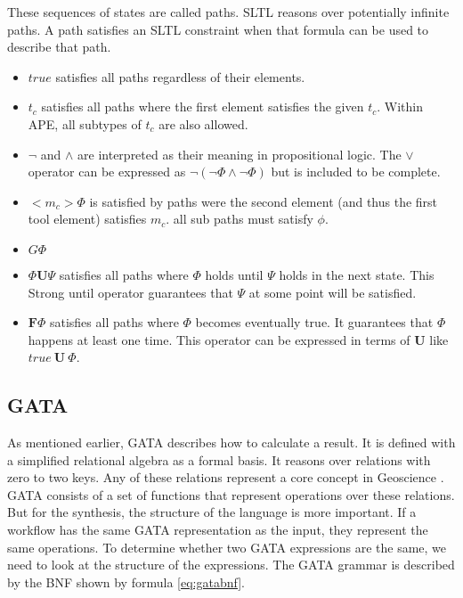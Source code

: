 \documentclass{article}
\begin{document}
These sequences of states are called paths. SLTL reasons over potentially infinite paths. A path satisfies an SLTL constraint when that formula can be used to describe that path. 

\begin{itemize}
    \item $true$ satisfies all paths regardless of their elements.
    \item $t_c$ satisfies all paths where the first element satisfies the given $t_c$. Within APE, all subtypes of $t_c$ are also allowed.
    \item $\neg$ and $\wedge$ are interpreted as their meaning in propositional logic. The $\vee$ operator can be expressed as $\neg(\neg \Phi \wedge \neg \Phi)$ but is included to be complete.
    
    \item $<m_c> \Phi$ is satisfied by paths were the second element (and thus the first tool element) satisfies $m_c$. all sub paths must satisfy $\phi$.
    
    \item $G\Phi$ 
    \item $\Phi \textbf{U} \Psi$ satisfies all paths where $\Phi$ holds until $\Psi$ holds in the next state. This Strong until operator guarantees that $\Psi$ at some point will be satisfied. 
    \item $\textbf{F}\Phi$ satisfies all paths where $\Phi$ becomes eventually true. It guarantees that $\Phi$ happens at least one time. This operator can be expressed in terms of \textbf{U} like $true\ \textbf{U}\ \Phi$.
    
\end{itemize}





\subsection{GATA}
As mentioned earlier, GATA describes how to calculate a result. It is defined with a simplified relational algebra as a formal basis. It reasons over relations with zero to two keys. Any of these relations represent a core concept in Geoscience \cite{kuhn2012core}. GATA consists of a set of functions that represent operations over these relations. 
But for the synthesis, the structure of the language is more important. If a workflow has the same GATA representation as the input, they represent the same operations. To determine whether two GATA expressions are the same, we need to look at the structure of the expressions. The GATA grammar is described by the BNF shown by formula \ref{eq:gatabnf}. 
\end{document}
